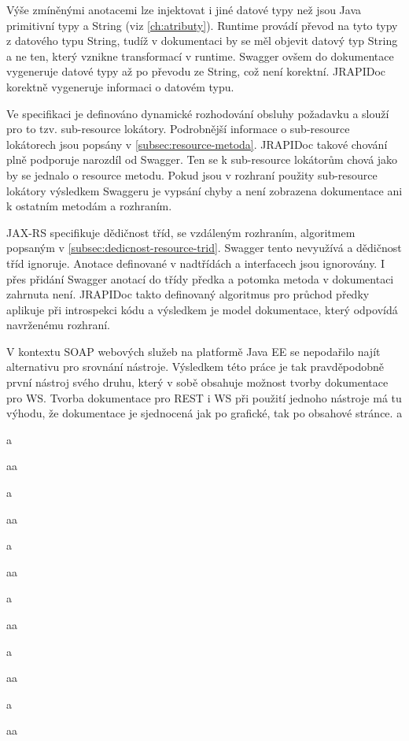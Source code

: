 \documentclass[11pt,twoside,a4paper]{book}
\begin{document}
Výše zmíněnými anotacemi lze injektovat i jiné datové typy než jsou Java
primitivní typy a String (viz \ref{ch:atributy}). Runtime provádí převod na tyto
typy z datového typu String, tudíž v dokumentaci by se měl objevit datový
typ String a ne ten, který vznikne transformací v runtime.
Swagger ovšem do dokumentace vygeneruje datové typy až po převodu ze String, což
není korektní. JRAPIDoc korektně vygeneruje informaci o datovém typu.

Ve specifikaci je definováno dynamické rozhodování obsluhy požadavku a slouží
pro to tzv. sub-resource lokátory. Podrobnější informace o sub-resource
lokátorech jsou popsány v \ref{subsec:resource-metoda}. JRAPIDoc takové chování
plně podporuje narozdíl od Swagger. Ten se k sub-resource lokátorům chová jako
by se jednalo o resource metodu. Pokud jsou v rozhraní použity sub-resource
lokátory výsledkem Swaggeru je vypsání chyby a není zobrazena dokumentace
ani k ostatním metodám a rozhraním.

JAX-RS specifikuje dědičnost tříd, se vzdáleným rozhraním, algoritmem popsaným v
\ref{subsec:dedicnost-resource-trid}. Swagger tento nevyužívá a dědičnost tříd
ignoruje. Anotace definované v nadtřídách a interfacech jsou ignorovány. I přes
přidání Swagger anotací do třídy předka a potomka metoda v dokumentaci zahrnuta
není. JRAPIDoc takto definovaný algoritmus pro průchod předky aplikuje při
introspekci kódu a výsledkem je model dokumentace, který odpovídá navrženému rozhraní.








V kontextu SOAP webových služeb na platformě Java EE se nepodařilo najít alternativu pro
srovnání nástroje. Výsledkem této práce je tak pravděpodobně první nástroj svého druhu,
který v sobě obsahuje možnost tvorby dokumentace pro WS. Tvorba dokumentace pro REST
i WS při použití jednoho nástroje má tu výhodu, že dokumentace je sjednocená jak po
grafické, tak po obsahové stránce.
a

a

aa

a

aa

a

aa

a

aa

a

aa

a

aa
\end{document}
